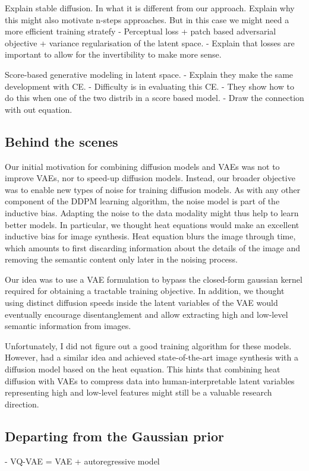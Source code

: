 Explain stable diffusion. In what it is different from our approach. Explain why this might also motivate n-steps approaches. But in this case we might need a more efficient training stratefy
- Perceptual loss + patch based adversarial objective + variance regularisation of the latent space.
- Explain that losses are important to allow for the invertibility to make more sense.

Score-based generative modeling in latent space.
- Explain they make the same development with CE.
- Difficulty is in evaluating this CE.
- They show how to do this when one of the two distrib in a score based model.
- Draw the connection with out equation.

\subsection{Behind the scenes}
Our initial motivation for combining diffusion models and VAEs was not to improve VAEs, nor to speed-up diffusion models. Instead, our broader objective was to enable new types of noise for training diffusion models. As with any other component of the DDPM learning algorithm, the noise model is part of the inductive bias. Adapting the noise to the data modality might thus help to learn better models. In particular, we thought heat equations would make an excellent inductive bias for image synthesis. Heat equation blurs the image through time, which amounts to first discarding information about the details of the image and removing the semantic content only later in the noising process.

Our idea was to use a VAE formulation to bypass the closed-form gaussian kernel required for obtaining a tractable training objective. In addition, we thought using distinct diffusion speeds inside the latent variables of the VAE would eventually encourage disentanglement and allow extracting high and low-level semantic information from images.

Unfortunately, I did not figure out a good training algorithm for these models. However, \citet{rissanen2022generative} had a similar idea and achieved state-of-the-art image synthesis with a diffusion model based on the heat equation. This hints that combining heat diffusion with VAEs to compress data into human-interpretable latent variables representing high and low-level features might still be a valuable research direction.

\subsection{Departing from the Gaussian prior}
- VQ-VAE = VAE + autoregressive model

